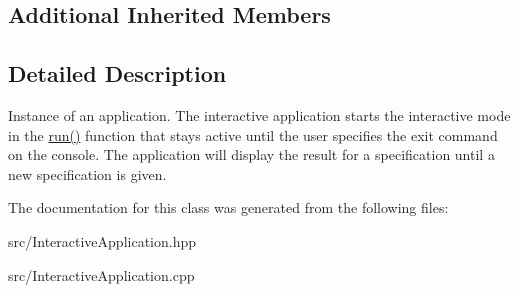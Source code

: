 \subsection*{Additional Inherited Members}


\subsection{Detailed Description}
Instance of an application. The interactive application starts the interactive mode in the \hyperlink{classInteractiveApplication_ae77593fe90fa4fae53dc8ca84ba1a239}{run()} function that stays active until the user specifies the \textquotesingle{}exit\textquotesingle{} command on the console. The application will display the result for a specification until a new specification is given. 

The documentation for this class was generated from the following files\+:\begin{DoxyCompactItemize}
\item 
src/Interactive\+Application.\+hpp\item 
src/Interactive\+Application.\+cpp\end{DoxyCompactItemize}

